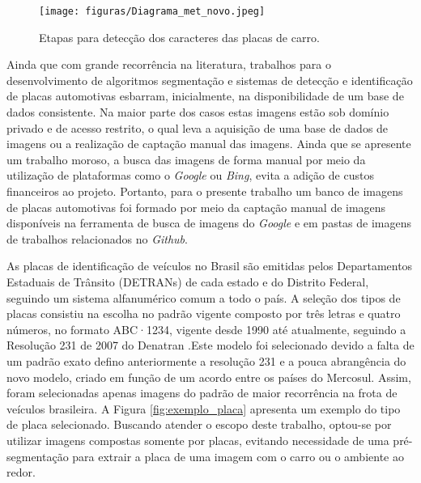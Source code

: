 \documentclass[
	12pt,				%
    oneside,			%
	a4paper,			%
	english,			%
	french,				%
	spanish,			%
	brazil,				%
	]{abntex2}
\begin{document}
\begin{figure}[!ht]
    \centering
    \texttt{[image: figuras/Diagrama\_met\_novo.jpeg]}
    \caption{Etapas para detecção dos caracteres das placas de carro.}
    \label{fig:mat_met}
\end{figure}

Ainda que com grande recorrência na literatura, trabalhos para o desenvolvimento de algoritmos segmentação e sistemas de detecção e identificação de placas automotivas esbarram, inicialmente, na disponibilidade de um base de dados consistente. Na maior parte dos casos estas imagens estão sob domínio privado e de acesso restrito, o qual leva a aquisição de uma base de dados de imagens ou a realização de captação manual das imagens. Ainda que se apresente um trabalho moroso, a busca das imagens de forma manual por meio da utilização de plataformas como o \textit{Google} ou \textit{Bing}, evita a adição de custos financeiros ao projeto. Portanto, para o presente trabalho um banco de imagens de placas automotivas foi formado por meio da captação manual de imagens disponíveis na ferramenta de busca de imagens do \textit{Google} e em pastas de imagens de trabalhos relacionados no \textit{Github}. 

As placas de identificação de veículos no Brasil são emitidas pelos Departamentos Estaduais de Trânsito (DETRANs) de cada estado e do Distrito Federal, seguindo um sistema alfanumérico comum a todo o país. A seleção dos tipos de placas consistiu na escolha no padrão vigente composto por três letras e quatro números, no formato ABC·1234, vigente desde {1990} até atualmente, seguindo a Resolução 231 de 2007 do Denatran \cite{res231}.Este modelo foi selecionado devido a falta de um padrão exato defino anteriormente a resolução 231 e a pouca abrangência do novo modelo, criado em função de um acordo entre os países do Mercosul. Assim, foram selecionadas apenas imagens do padrão de maior recorrência na frota de veículos brasileira. A Figura \ref{fig:exemplo_placa} apresenta um exemplo do tipo de placa selecionado. Buscando atender o escopo deste trabalho, optou-se por utilizar imagens compostas somente por placas, evitando necessidade de uma pré-segmentação para extrair a placa de uma imagem com o carro ou o ambiente ao redor.


\end{document}
